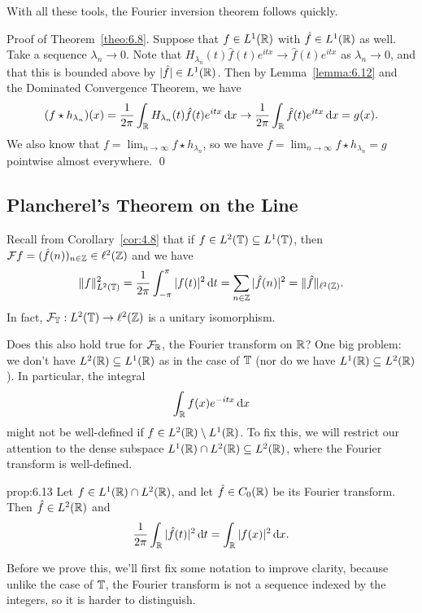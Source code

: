 With all these tools, the Fourier inversion theorem follows quickly. 

{\sc Proof of Theorem~\ref{theo:6.8}.} Suppose that $f \in L^1(\mathbb{R})$ with 
$\hat f \in L^1(\mathbb{R})$ as well. Take a sequence $\lambda_n \to 0$. 
Note that $H_{\lambda_n}(t) \hat f(t) e^{itx} \to \hat f(t) e^{itx}$ 
as $\lambda_n \to 0$, and that this is bounded above by $|\hat f| \in L^1(\mathbb{R})$. 
Then by Lemma~\ref{lemma:6.12} and the Dominated Convergence Theorem, we have 
\[ (f \star h_{\lambda_n})(x) = \frac{1}{2\pi} \int_{\mathbb{R}} H_{\lambda_n}(t) 
\hat f(t) e^{itx} \,\mathrm{d} x \to \frac{1}{2\pi} \int_{\mathbb{R}} \hat f(t) e^{itx} \,\mathrm{d} x = g(x). \]
We also know that $f = \lim_{n\to\infty} f \star h_{\lambda_n}$, so 
we have $f = \lim_{n\to\infty} f \star h_{\lambda_n} = g$ pointwise 
almost everywhere. \qed 

\subsection{Plancherel's Theorem on the Line} \label{subsec:6.4}
Recall from Corollary~\ref{cor:4.8} that if $f \in L^2(\mathbb{T}) \subseteq L^1(\mathbb{T})$, 
then ${\cal F}f = (\hat f(n))_{n\in\mathbb{Z}} \in \ell^2(\mathbb{Z})$ and we have 
\[ \|f\|_{L^2(\mathbb{T})}^2 = \frac{1}{2\pi} \int_{-\pi}^\pi |f(t)|^2\,\mathrm{d} t 
= \sum_{n\in\mathbb{Z}} |\hat f(n)|^2 = \|\hat f\|_{\ell^2(\mathbb{Z})}. \] 
In fact, ${\cal F}_{\mathbb{T}} : L^2(\mathbb{T}) \to \ell^2(\mathbb{Z})$ is a unitary isomorphism. 

Does this also hold true for ${\cal F}_{\mathbb{R}}$, the Fourier transform on $\mathbb{R}$? 
One big problem: we don't have $L^2(\mathbb{R}) \subseteq L^1(\mathbb{R})$ as in the case of 
$\mathbb{T}$ (nor do we have $L^1(\mathbb{R}) \subseteq L^2(\mathbb{R})$). In particular, 
the integral 
\[ \int_{\mathbb{R}} f(x) e^{-itx}\,\mathrm{d} x \] 
might not be well-defined if $f \in L^2(\mathbb{R}) \setminus L^1(\mathbb{R})$. To fix this, 
we will restrict our attention to the dense subspace $L^1(\mathbb{R}) \cap L^2(\mathbb{R}) 
\subseteq L^2(\mathbb{R})$, where the Fourier transform is well-defined. 

\begin{prop}{prop:6.13}
    Let $f \in L^1(\mathbb{R}) \cap L^2(\mathbb{R})$, and let $\hat f \in C_0(\mathbb{R})$ be its 
    Fourier transform. Then $\hat f \in L^2(\mathbb{R})$ and 
    \[ \frac{1}{2\pi} \int_{\mathbb{R}} |\hat f(t)|^2\,\mathrm{d} t = \int_{\mathbb{R}} |f(x)|^2\,\mathrm{d} x. \] 
\end{prop}

Before we prove this, we'll first fix some notation to improve clarity, 
because unlike the case of $\mathbb{T}$, the Fourier transform is not a sequence 
indexed by the integers, so it is harder to distinguish. 

